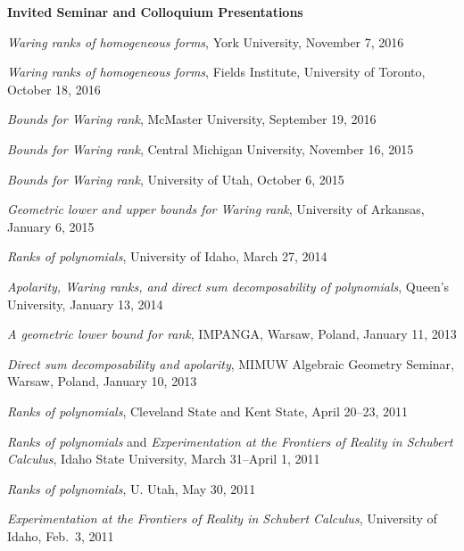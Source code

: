 \documentclass[12pt]{article}
\begin{document}
\textbf{Invited Seminar and Colloquium Presentations}
\begin{description}
\setlength{}
\item[] \textit{Waring ranks of homogeneous forms}, York University, November 7, 2016
\item[] \textit{Waring ranks of homogeneous forms}, Fields Institute, University of Toronto, October 18, 2016
\item[] \textit{Bounds for Waring rank}, McMaster University, September 19, 2016
\item[] \textit{Bounds for Waring rank}, Central Michigan University, November 16, 2015
\item[] \textit{Bounds for Waring rank}, University of Utah, October 6, 2015
\item[] \textit{Geometric lower and upper bounds for Waring rank}, University of Arkansas, January 6, 2015
\item[] \textit{Ranks of polynomials}, University of Idaho, March 27, 2014
\item[] \textit{Apolarity, Waring ranks, and direct sum decomposability of polynomials}, Queen's University, January 13, 2014
\item[] \textit{A geometric lower bound for rank}, IMPANGA, Warsaw, Poland, January 11, 2013
\item[] \textit{Direct sum decomposability and apolarity}, MIMUW Algebraic Geometry Seminar, Warsaw, Poland, January 10, 2013
\item[] \textit{Ranks of polynomials}, Cleveland State and Kent State, April 20--23, 2011
\item[] \textit{Ranks of polynomials} and \textit{Experimentation at the Frontiers of Reality in Schubert Calculus}, Idaho State University, March 31--April 1, 2011
\item[] \textit{Ranks of polynomials}, U. Utah, May 30, 2011
\item[] \textit{Experimentation at the Frontiers of Reality in Schubert Calculus}, University of Idaho, Feb.\ 3, 2011


\end{description}
\end{document}
